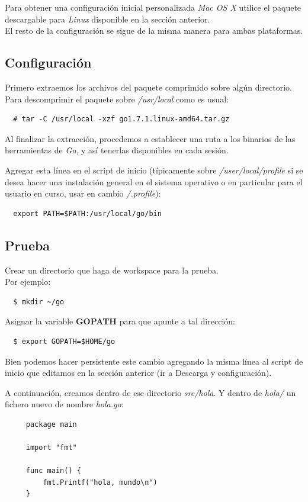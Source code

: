 \documentclass[12pt]{article}
\begin{document}
Para obtener una configuración inicial personalizada \textit{Mac OS X} utilice el paquete descargable para \textit{Linux} disponible en la sección anterior.\\

El resto de la configuración se sigue de la misma manera para ambas plataformas.

\subsection*{Configuración}
Primero extraemos los archivos del paquete comprimido sobre algún directorio.\\
Para descomprimir el paquete sobre \textit{/usr/local} como es usual:
\begin{verbatim}
  # tar -C /usr/local -xzf go1.7.1.linux-amd64.tar.gz
\end{verbatim}
Al finalizar la extracción, procedemos a establecer una ruta a los binarios de las herramientas de \textit{Go}, y así tenerlas disponibles en cada sesión.\par
Agregar esta línea en el script de inicio (típicamente sobre \textit{/user/local/profile}
si se desea hacer una instalación general en el sistema operativo o
en particular para el usuario en curso, usar en cambio \textit{/.profile}):
\begin{verbatim}
  export PATH=$PATH:/usr/local/go/bin
\end{verbatim}

\subsection*{Prueba}
Crear un directorio que haga de workspace para la prueba.\\
Por ejemplo:
\begin{verbatim}
  $ mkdir ~/go
\end{verbatim}
Asignar la variable \textbf{GOPATH} para que apunte a tal dirección:
\begin{verbatim}
  $ export GOPATH=$HOME/go
\end{verbatim}
Bien podemos hacer persistente este cambio agregando la misma línea al script
de inicio que editamos en la sección anterior (ir a Descarga y configuración). \par

A continuación, creamos dentro de ese directorio  \textit{src/hola}.
Y dentro de \textit{hola/} un fichero nuevo de nombre \textit{hola.go}:
\begin{verbatim}
     package main

     import "fmt"

     func main() {
         fmt.Printf("hola, mundo\n")
     }
\end{verbatim}
\end{document}
